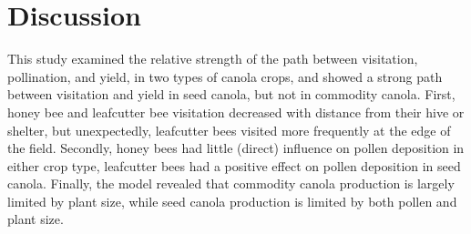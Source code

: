 \documentclass[12pt]{article} %
\begin{document}
\section{Discussion}
This study examined the relative strength of the path between visitation, pollination, and yield, in two types of canola crops, and showed a strong path between visitation and yield in seed canola, but not in commodity canola.
First, honey bee and leafcutter bee visitation decreased with distance from their hive or shelter, but unexpectedly, leafcutter bees visited more frequently at the edge of the field.
Secondly, honey bees had little (direct) influence on pollen deposition in either crop type, leafcutter bees had a positive effect on pollen deposition in seed canola.
Finally, the model revealed that commodity canola production is largely limited by plant size, while seed canola production is limited by both pollen and plant size.
\end{document}
